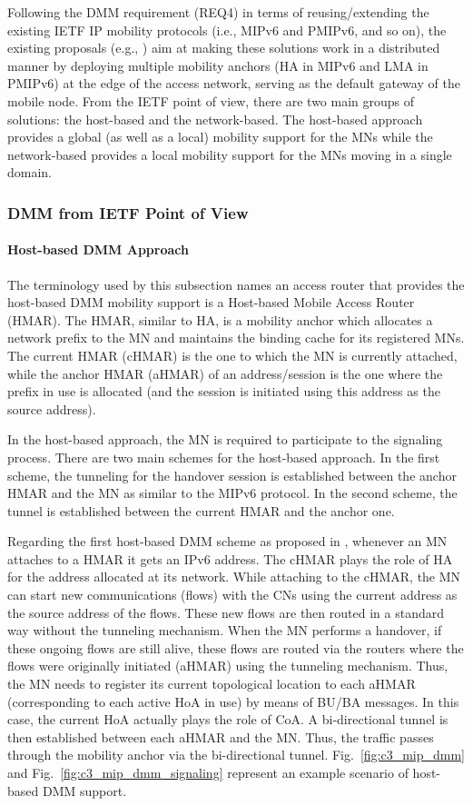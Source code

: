 Following the DMM requirement (REQ4) in terms of reusing/extending the existing IETF IP mobility protocols (i.e., MIPv6 and PMIPv6, and so on), the existing proposals (e.g., \cite{DMA, PMIP_based_DMM_Bernardos}) aim at making these solutions work in a distributed manner by deploying multiple mobility anchors (HA in MIPv6 and LMA in PMIPv6) at the edge of the access network, serving as the default gateway of the mobile node. From the IETF point of view, there are two main groups of solutions: the host-based and the network-based. The host-based approach provides a global (as well as a local) mobility support for the MNs while the network-based provides a local mobility support for the MNs moving in a single domain. 
\subsubsection{DMM from IETF Point of View}
\paragraph{Host-based DMM Approach}

The terminology used by this subsection names an access router that provides the host-based DMM mobility support is a Host-based Mobile Access Router (HMAR). The HMAR, similar to HA, is a mobility anchor which allocates a network prefix to the MN and maintains the binding cache for its registered MNs. The current HMAR (cHMAR) is the one to which the MN is currently attached, while the anchor HMAR (aHMAR) of an address/session is the one where the prefix in use is allocated (and the session is initiated using this address as the source address).  

In the host-based approach, the MN is required to participate to the signaling process. There are two main schemes for the host-based approach. In the first scheme, the tunneling for the handover session is established between the anchor HMAR and the MN as similar to the MIPv6 protocol. In the second scheme, the tunnel is established between the current HMAR and the anchor one. 

Regarding the first host-based DMM scheme as proposed in \cite{MIP_based_DMM_Bernardos,MIP_based_DMM_Hassan}, whenever an MN attaches to a HMAR it gets an IPv6 address. The cHMAR plays the role of HA for the address allocated at its network. While attaching to the cHMAR, the MN can start new communications (flows) with the CNs using the current address as the source address of the flows. These new flows are then routed in a standard way without the tunneling mechanism. When the MN performs a handover, if these ongoing flows are still alive, these flows are routed via the routers where the flows were originally initiated (aHMAR) using the tunneling mechanism. Thus, the MN needs to register its current topological location to each aHMAR (corresponding to each active HoA in use) by means of BU/BA messages. In this case, the current HoA actually plays the role of CoA. A bi-directional tunnel is then established between each aHMAR and the MN. Thus, the traffic passes through the mobility anchor via the bi-directional tunnel. Fig.~\ref{fig:c3_mip_dmm} and Fig.~\ref{fig:c3_mip_dmm_signaling} represent an example scenario of host-based DMM support.

